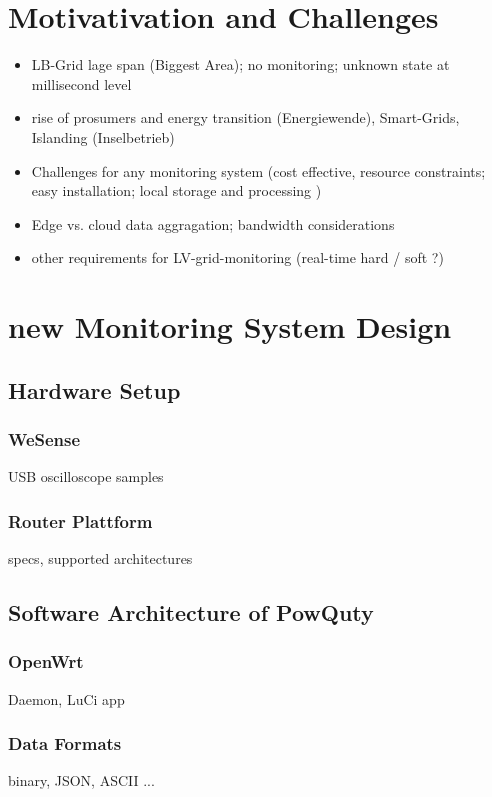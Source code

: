 \documentclass{sig-alternate}
\begin{document}
	\section{Motivativation and Challenges}
		\begin{itemize}
			\item LB-Grid lage span (Biggest Area); no monitoring; unknown state at millisecond level
			\item rise of prosumers and energy transition (Energiewende), Smart-Grids, Islanding (Inselbetrieb)
			\item Challenges for any monitoring system (cost effective, resource constraints; easy installation; local storage and processing )
			\item Edge vs. cloud data aggragation; bandwidth considerations
			\item other requirements for LV-grid-monitoring (real-time hard / soft ?)
		\end{itemize}


	\section{new Monitoring System Design}

		\subsection{Hardware Setup}

			\subsubsection{WeSense}
				USB oscilloscope samples

			\subsubsection{Router Plattform}
				specs, supported architectures


		\subsection{Software Architecture of PowQuty}
			\subsubsection{OpenWrt}
				Daemon, LuCi app
			\subsubsection{Data Formats}
				binary, JSON, ASCII ...
\end{document}
